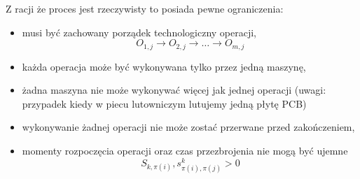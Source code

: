 \newpage
Z racji że proces jest rzeczywisty to posiada pewne ograniczenia:
\begin{itemize}
	\item musi być zachowany porządek technologiczny operacji,
	      \begin{equation}
	      	O_{1,j} \rightarrow O_{2,j} \rightarrow \dots \rightarrow O_{m,j}
	      \end{equation}
	\item każda operacja może być wykonywana tylko przez jedną maszynę,
	\item żadna maszyna nie może wykonywać więcej jak jednej operacji (uwagi: przypadek kiedy w piecu lutowniczym lutujemy jedną płytę PCB)
	\item wykonywanie żadnej operacji nie może zostać przerwane przed zakończeniem,
	\item momenty rozpoczęcia operacji oraz czas przezbrojenia nie mogą być ujemne
	      \begin{equation}
	      	S_{k,\pi(i)},s^{k}_{\pi(i),\pi(j)} > 0
	      \end{equation}
\end{itemize}
